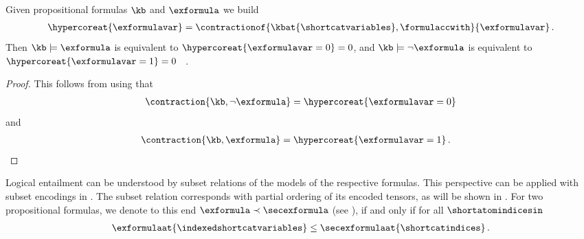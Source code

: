 \begin{theorem}
    \label{the:entailmentContradictionContraction}
    Given propositional formulas $\kb$ and $\exformula$ we build
    \begin{align*}
        \hypercoreat{\exformulavar}
        = \contractionof{\kbat{\shortcatvariables},\formulaccwith}{\exformulavar} \, .
    \end{align*}
    Then $\kb\models\exformula$ is equivalent to $\hypercoreat{\exformulavar=0}=0$, and $\kb\models\lnot\exformula$ is equivalent to $\hypercoreat{\exformulavar=1}=0$ \, .
\end{theorem}
\begin{proof}
    This follows from  using that
    \begin{align*}
        \contraction{\kb,\lnot\exformula} = \hypercoreat{\exformulavar=0}
    \end{align*}
    and
    \begin{align*}
        \contraction{\kb,\exformula} = \hypercoreat{\exformulavar=1} \, . & \qedhere
    \end{align*}
\end{proof}






Logical entailment can be understood by subset relations of the models of the respective formulas.
This perspective can be applied with subset encodings in .
The subset relation corresponds with partial ordering of its encoded tensors, as will be shown in .
For two propositional formulas, we denote to this end $\exformula\prec\secexformula$ (see ), if and only if for all $\shortatomindicesin$
\begin{align*}
    \exformulaat{\indexedshortcatvariables} \leq \secexformulaat{\shortcatindices}  \, .
\end{align*}

